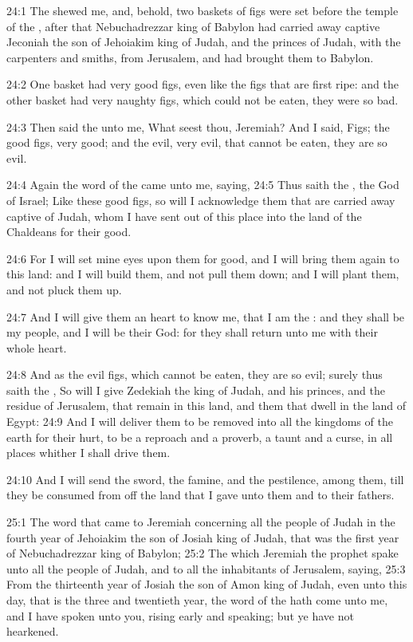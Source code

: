 24:1 The \LORD shewed me, and, behold, two baskets of figs were set before the temple of the \LORD, after that Nebuchadrezzar king of Babylon had carried away captive Jeconiah the son of Jehoiakim king of Judah, and the princes of Judah, with the carpenters and smiths, from Jerusalem, and had brought them to Babylon.

24:2 One basket had very good figs, even like the figs that are first ripe: and the other basket had very naughty figs, which could not be eaten, they were so bad.

24:3 Then said the \LORD unto me, What seest thou, Jeremiah? And I said, Figs; the good figs, very good; and the evil, very evil, that cannot be eaten, they are so evil.

24:4 Again the word of the \LORD came unto me, saying, 24:5 Thus saith the \LORD, the God of Israel; Like these good figs, so will I acknowledge them that are carried away captive of Judah, whom I have sent out of this place into the land of the Chaldeans for their good.

24:6 For I will set mine eyes upon them for good, and I will bring them again to this land: and I will build them, and not pull them down; and I will plant them, and not pluck them up.

24:7 And I will give them an heart to know me, that I am the \LORD: and they shall be my people, and I will be their God: for they shall return unto me with their whole heart.

24:8 And as the evil figs, which cannot be eaten, they are so evil; surely thus saith the \LORD, So will I give Zedekiah the king of Judah, and his princes, and the residue of Jerusalem, that remain in this land, and them that dwell in the land of Egypt: 24:9 And I will deliver them to be removed into all the kingdoms of the earth for their hurt, to be a reproach and a proverb, a taunt and a curse, in all places whither I shall drive them.

24:10 And I will send the sword, the famine, and the pestilence, among them, till they be consumed from off the land that I gave unto them and to their fathers.

25:1 The word that came to Jeremiah concerning all the people of Judah in the fourth year of Jehoiakim the son of Josiah king of Judah, that was the first year of Nebuchadrezzar king of Babylon; 25:2 The which Jeremiah the prophet spake unto all the people of Judah, and to all the inhabitants of Jerusalem, saying, 25:3 From the thirteenth year of Josiah the son of Amon king of Judah, even unto this day, that is the three and twentieth year, the word of the \LORD hath come unto me, and I have spoken unto you, rising early and speaking; but ye have not hearkened.

